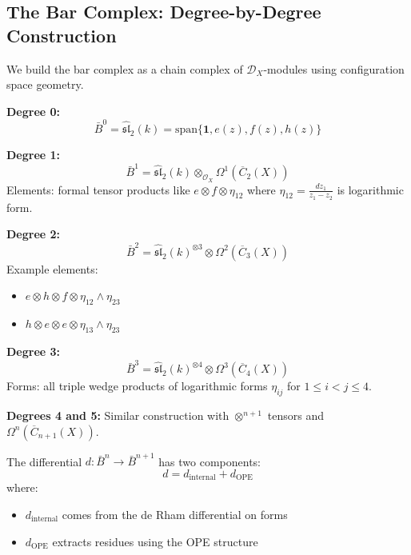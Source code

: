 \subsection{The Bar Complex: Degree-by-Degree Construction}

\begin{construction}
We build the bar complex as a chain complex of $\mathcal{D}_X$-modules using configuration space geometry.

\textbf{Degree 0:}
$$\bar{B}^0 = \widehat{\mathfrak{sl}}_2(k) = \text{span}\{\mathbf{1}, e(z), f(z), h(z)\}$$

\textbf{Degree 1:}
$$\bar{B}^1 = \widehat{\mathfrak{sl}}_2(k) \otimes_{\mathcal{O}_X} \Omega^1(\overline{C}_2(X))$$
Elements: formal tensor products like $e \otimes f \otimes \eta_{12}$ where $\eta_{12} = \frac{dz_1}{z_1-z_2}$ is logarithmic form.

\textbf{Degree 2:}
$$\bar{B}^2 = \widehat{\mathfrak{sl}}_2(k)^{\otimes 3} \otimes \Omega^2(\overline{C}_3(X))$$
Example elements:
\begin{itemize}
\item $e \otimes h \otimes f \otimes \eta_{12} \wedge \eta_{23}$
\item $h \otimes e \otimes e \otimes \eta_{13} \wedge \eta_{23}$
\end{itemize}

\textbf{Degree 3:}
$$\bar{B}^3 = \widehat{\mathfrak{sl}}_2(k)^{\otimes 4} \otimes \Omega^3(\overline{C}_4(X))$$
Forms: all triple wedge products of logarithmic forms $\eta_{ij}$ for $1 \le i < j \le 4$.

\textbf{Degrees 4 and 5:} Similar construction with $\otimes^{n+1}$ tensors and $\Omega^n(\overline{C}_{n+1}(X))$.
\end{construction}

\begin{theorem}
The differential $d: \bar{B}^n \to \bar{B}^{n+1}$ has two components:
$$d = d_{\text{internal}} + d_{\text{OPE}}$$
where:
\begin{itemize}
\item $d_{\text{internal}}$ comes from the de Rham differential on forms
\item $d_{\text{OPE}}$ extracts residues using the OPE structure
\end{itemize}
\end{theorem}

